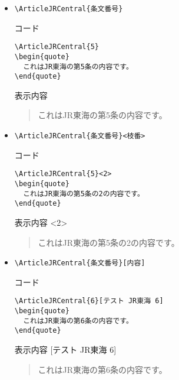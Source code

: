 \documentclass[oneside,10pt,a4paper]{jsarticle}
\begin{document}
  \begin{itemize}
    \item \verb|\ArticleJRCentral{条文番号}|
      \begin{itembox}[l]{コード}
        {\footnotesize\begin{verbatim}
\ArticleJRCentral{5}
\begin{quote}
  これはJR東海の第5条の内容です。
\end{quote}\end{verbatim}}
      \end{itembox}
      \begin{itembox}[l]{表示内容}
        \begin{quote}
          これはJR東海の第5条の内容です。
        \end{quote}
      \end{itembox}
    \item \verb|\ArticleJRCentral{条文番号}<枝番>|
      \begin{itembox}[l]{コード}
        {\footnotesize\begin{verbatim}
\ArticleJRCentral{5}<2>
\begin{quote}
  これはJR東海の第5条の2の内容です。
\end{quote}\end{verbatim}}
      \end{itembox}
      \begin{itembox}[l]{表示内容}
        <2>
        \begin{quote}
          これはJR東海の第5条の2の内容です。
        \end{quote}
      \end{itembox}
    \newpage
    \item \verb|\ArticleJRCentral{条文番号}[内容]|
      \begin{itembox}[l]{コード}
        {\footnotesize\begin{verbatim}
\ArticleJRCentral{6}[テスト JR東海 6]
\begin{quote}
  これはJR東海の第6条の内容です。
\end{quote}\end{verbatim}}
      \end{itembox}
      \begin{itembox}[l]{表示内容}
        [テスト JR東海 6]
        \begin{quote}
          これはJR東海の第6条の内容です。
        \end{quote}
      \end{itembox}

\end{itemize}
\end{document}
